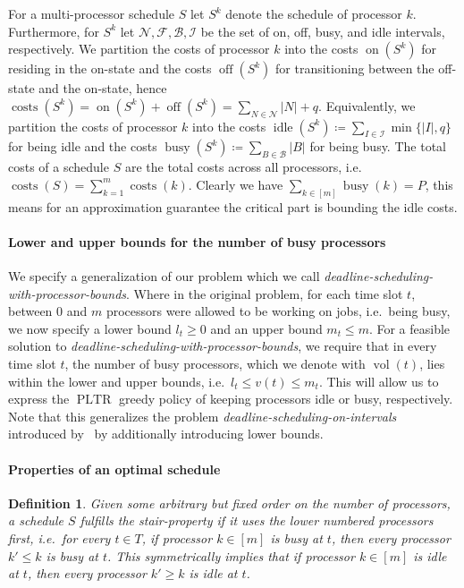 \documentclass[a4paper]{article}
\DeclareMathOperator{\on}{on}
\DeclareMathOperator{\off}{off}
\DeclareMathOperator{\idle}{idle}
\DeclareMathOperator{\busy}{busy}
\DeclareMathOperator{\costs}{costs}
\DeclareMathOperator{\PLTR}{PLTR}
\DeclareMathOperator{\vol}{vol}
\newtheorem{definition}[theorem]{Definition}
\begin{document}
For a multi-processor schedule $S$ let $S^k$ denote the schedule of processor $k$.
Furthermore, for $S^k$ let $\mathcal{N}, \mathcal{F}, \mathcal{B}, \mathcal{I}$ be the set of on, off, busy, and idle intervals, respectively.
We partition the costs of processor $k$ into the costs $\on(S^k)$ for residing in the on-state and the costs $\off(S^k)$ for transitioning between the off-state and the on-state, hence $\costs(S^k) = \on(S^k) + \off(S^k) = \sum_{N \in \mathcal{N}} |N| + q$.
Equivalently, we partition the costs of processor $k$ into the costs $\idle(S^k) \coloneqq \sum_{I \in \mathcal{I}} \min \{ |I|, q \}$ for being idle and the costs $\busy(S^k) \coloneqq \sum_{B \in \mathcal{B}} |B|$ for being busy.
The total costs of a schedule $S$ are the total costs across all processors, i.e.\ $\costs(S) = \sum_{k = 1}^{m} \costs(k)$.
Clearly we have $\sum_{k \in [m]} \busy(k) = P$, this means for an approximation guarantee the critical part is bounding the idle costs.

\paragraph{Lower and upper bounds for the number of busy processors}
We specify a generalization of our problem which we call \emph{deadline-scheduling-with-processor-bounds}.
Where in the original problem, for each time slot $t$, between $0$ and $m$ processors were allowed to be working on jobs, i.e.\ being busy, we now specify a lower bound $l_t \geq 0$ and an upper bound $m_t \leq m$.
For a feasible solution to \emph{deadline-scheduling-with-processor-bounds}, we require that in every time slot $t$, the number of busy processors, which we denote with $\vol(t)$, lies within the lower and upper bounds, i.e.\ $l_t \leq v(t) \leq m_t$.
This will allow us to express the $\PLTR$ greedy policy of keeping processors idle or busy, respectively.
Note that this generalizes the problem \emph{deadline-scheduling-on-intervals} introduced by~\cite{antoniadis} by additionally introducing lower bounds.

\paragraph{Properties of an optimal schedule}
\begin{definition}\label{def:stair_property}
  Given some arbitrary but fixed order on the number of processors, a schedule $S$ fulfills the \emph{stair-property} if it uses the lower numbered processors first, i.e.\ for every $t \in T$, if processor $k \in [m]$ is busy at $t$, then every processor $k' \leq k$ is busy at $t$.
  This symmetrically implies that if processor $k \in [m]$ is idle at $t$, then every processor $k' \geq k$ is idle at $t$.
\end{definition}
\end{document}
